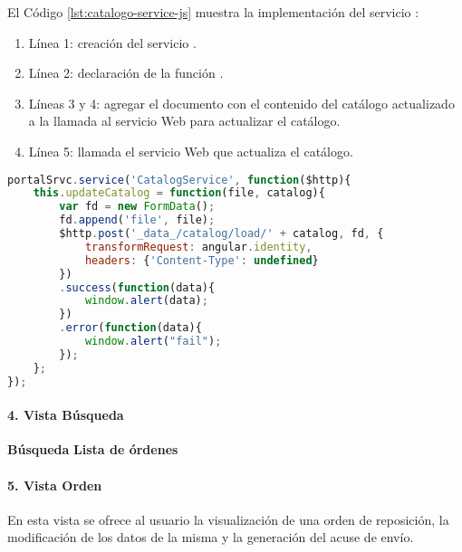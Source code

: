 El Código \ref{lst:catalogo-service-js} muestra la implementación del servicio :
\begin{enumerate}
	\item Línea 1: creación del servicio .
	\item Línea 2: declaración de la función .
	\item Líneas 3 y 4: agregar el documento con el contenido del catálogo actualizado a la llamada al servicio Web para actualizar el catálogo.
	\item Línea 5: llamada el servicio Web que actualiza el catálogo.
\end{enumerate}
\begin{lstlisting}[language=Javascript, caption={Servicio en AngularJS actualizar un catálogo.}, captionpos=b, label={lst:catalogo-service-js}]
portalSrvc.service('CatalogService', function($http){
	this.updateCatalog = function(file, catalog){
		var fd = new FormData();
		fd.append('file', file);
		$http.post('_data_/catalog/load/' + catalog, fd, {
			transformRequest: angular.identity,
			headers: {'Content-Type': undefined}
		})
		.success(function(data){
			window.alert(data);
		})
		.error(function(data){
			window.alert("fail");
		});
    };	
});
\end{lstlisting}

\paragraph{4. Vista Búsqueda\\}
\textbf{Búsqueda}
\textbf{Lista de órdenes}

\paragraph{5. Vista Orden\\}

En esta vista se ofrece al usuario la visualización de una orden de reposición, la modificación de los datos de la misma y la generación del acuse de envío.

